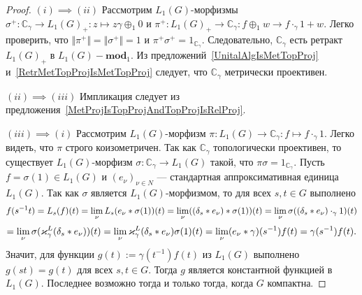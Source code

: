 \begin{proof} $(i) \implies (ii)$ Рассмотрим $L_1(G)$-морфизмы
$\sigma^+:\mathbb{C}_\gamma\to {L_1(G)}_+:z\mapsto z\gamma \oplus_1 0$ и
$\pi^+:{L_1(G)}_+\to\mathbb{C}_\gamma: f\oplus_1 w\to f\cdot_{\gamma}1+w$. Легко
проверить, что $\Vert\pi^+\Vert=\Vert\sigma^+\Vert=1$ и
$\pi^+\sigma^+=1_{\mathbb{C}_\gamma}$. Следовательно, $\mathbb{C}_\gamma$ есть
ретракт ${L_1(G)}_+$ в $L_1(G)-\mathbf{mod}_1$. Из
предложений~\ref{UnitalAlgIsMetTopProj} и~\ref{RetrMetTopProjIsMetTopProj}
следует, что $\mathbb{C}_\gamma$ метрически проективен.

$(ii) \implies (iii)$ Импликация следует из
предложения~\ref{MetProjIsTopProjAndTopProjIsRelProj}.

$(iii) \implies (i)$ Рассмотрим $L_1(G)$-морфизм
$\pi:L_1(G)\to\mathbb{C}_\gamma:f\mapsto f\cdot_{\gamma} 1$. Легко видеть, что
$\pi$ строго коизометричен. Так как $\mathbb{C}_\gamma$ топологически
проективен, то существует $L_1(G)$-морфизм $\sigma:\mathbb{C}_\gamma\to L_1(G)$
такой, что $\pi\sigma=1_{\mathbb{C}_\gamma}$. Пусть $f=\sigma(1)\in L_1(G)$ и
${(e_\nu)}_{\nu\in N}$ --- стандартная аппроксимативная единица $L_1(G)$. Так как
$\sigma$ является $L_1(G)$-морфизмом, то для всех $s,t\in G$ выполнено 
$$
f(s^{-1}t)
=L_s(f)(t)
=\lim_\nu L_s(e_\nu\ast \sigma(1))(t)
=\lim_\nu((\delta_s\ast e_\nu)\ast \sigma(1))(t)
=\lim_\nu\sigma((\delta_s\ast e_\nu)\cdot_{\gamma} 1)(t)
$$
$$
=\lim_\nu\sigma(\varkappa_\gamma^L(\delta_s\ast e_\nu))(t)
=\lim_\nu\varkappa_\gamma^L(\delta_s\ast e_\nu)\sigma(1)(t)
=\lim_\nu(e_\nu\ast\gamma)(s^{-1})f(t)
=\gamma(s^{-1})f(t).
$$
Значит, для функции $g(t):=\gamma(t^{-1})f(t)$ из $L_1(G)$ выполнено
$g(st)=g(t)$ для всех $s,t\in G$. Тогда $g$ является константной функцией в
$L_1(G)$. Последнее возможно тогда и только тогда, когда $G$ компактна.
\end{proof}

